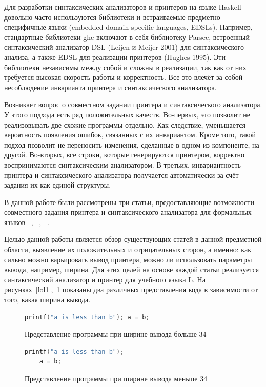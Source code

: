 \documentclass{matmex-diploma-custom}
\begin{document}
Для разработки синтаксических анализаторов и принтеров на языке Haskell довольно часто используются библиотеки и встраиваемые предметно-специфичные языки (embedded domain-specific languages, EDSLs). Например, стандартные библиотеки ghc включают в себя библиотеку Parsec, встроенный синтаксический анализатор DSL (Leijen и Meijer 2001) для синтаксического анализа, а также EDSL для реализации принтеров (Hughes 1995). Эти библиотеки независимы между собой и сложны в реализации, так как от них требуется высокая скорость работы и корректность. Все это влечёт за собой несоблюдение инварианта принтера и синтаксического анализатора.

Возникает вопрос о совместном задании принтера и синтаксического анализатора. У этого подхода есть ряд положительных качеств. Во-первых, это позволит не реализовывать две схожие программы отдельно. Как следствие, уменьшается вероятность появления ошибок, связанных с их инвариантом. Кроме того, такой подход позволит не переносить изменения, сделанные в одном из компоненте, на другой. Во-вторых, все строки, которые генерируются принтером, корректно воспринимаются синтаксическим анализатором. В-третьих, инвариантность принтера и синтаксического анализатора получается автоматически за счёт задания их как единой структуры.

В данной работе были рассмотрены три статьи, предоставляющие возможности совместного задания принтера и синтаксического анализатора для формальных языков ~\cite{Rendel}, ~\cite{Matsuda}, ~\cite{Boespflug}.

Целью данной работы является обзор существующих статей в данной предметной области, выявление их положительных и отрицательных сторон, а именно: как сильно можно варьировать вывод принтера, можно ли использовать параметры вывода, например, ширина. Для этих целей на основе каждой статьи реализуется синтаксический анализатор и принтер для учебного языка L. На рисунках~\ref{lol1},~\ref{lol2} показаны два различных представления кода в зависимости от того, какая ширина вывода.

\begin{figure}[h]
  \centering
  \begin{minipage}[h]{0.4\textwidth}
    \begin{lstlisting}[language = C]
printf("a is less than b"); a = b;
    \end{lstlisting}
    \caption{Представление программы при ширине вывода больше 34}
    \label{lol1}
  \end{minipage}
  \hfill
  \begin{minipage}[h]{0.4\textwidth}
    \begin{lstlisting}[language = C]
printf("a is less than b"); 
    a = b;
    \end{lstlisting}
    \caption{Представление программы при ширине вывода меньше 34}
    \label{lol2}
  \end{minipage}
\end{figure}
\end{document}
